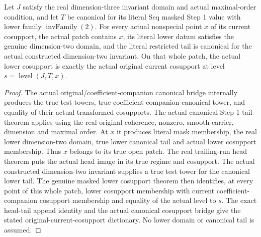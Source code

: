 \begin{lemma}
\label{hir:dimension-three-actual-lower-domain-dictionary}
\leanok
Let $J$ satisfy the real dimension-three invariant domain and actual
maximal-order condition, and let $T$ be canonical for its literal Seq
masked Step 1 value with lower family $\operatorname{invFamily}(2)$.
For every actual nonspecial point $x$ of its current cosupport, the
actual patch contains $x$, its literal lower datum satisfies the genuine
dimension-two domain, and the literal restricted tail is canonical for
the actual constructed dimension-two invariant. On that whole patch,
the actual lower cosupport is exactly the actual original current
cosupport at level $s=\operatorname{level}(J,T,x)$.
\end{lemma}
\begin{proof}
The actual original/coefficient-companion canonical bridge internally
produces the true test towers, true coefficient-companion canonical tower,
and equality of their actual transformed cosupports. The actual canonical
Step 1 tail theorem applies using the real original coherence, nonzero,
smooth carrier, dimension and maximal order. At $x$ it produces literal
mask membership, the real lower dimension-two domain, true lower canonical
tail and actual lower cosupport membership. Thus $x$ belongs to its true
open patch. The real trailing-run head theorem puts the actual head image
in its true regime and cosupport. The actual constructed dimension-two
invariant supplies a true test tower for the canonical lower tail.
The genuine masked lower cosupport theorem then identifies, at every
point of this whole patch, lower cosupport membership with current
coefficient-companion cosupport membership and equality of the actual
level to $s$. The exact head-tail append identity and the actual canonical
cosupport bridge give the stated original-current-cosupport dictionary.
No lower domain or canonical tail is assumed.
\end{proof}

